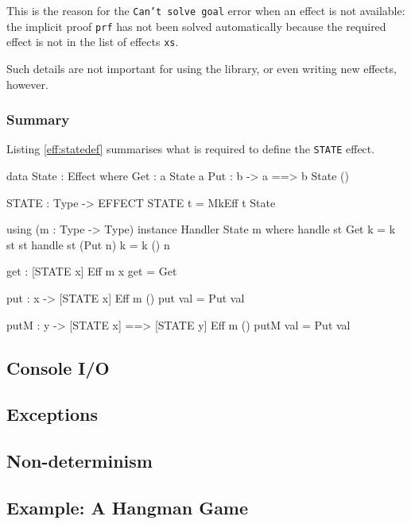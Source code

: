 \noindent
This is the reason for the \texttt{Can't solve goal} error when an effect is
not available: the implicit proof \texttt{prf} has not been solved automatically
because the required effect is not in the list of effects \texttt{xs}.

Such details are not important for using the library, or even writing new
effects, however. 

\subsubsection*{Summary}

Listing \ref{eff:statedef} summarises what is required to define the
\texttt{STATE} effect.

\begin{code}[float=h,frame=single, caption={Complete State Effect Definition}, label=eff:statedef]
data State : Effect where
     Get :      { a }       State a
     Put : b -> { a ==> b } State () 

STATE : Type -> EFFECT
STATE t = MkEff t State

using (m : Type -> Type)
  instance Handler State m where
     handle st Get     k = k st st
     handle st (Put n) k = k () n

get : { [STATE x] } Eff m x
get = Get

put : x -> { [STATE x] } Eff m () 
put val = Put val

putM : y -> { [STATE x] ==> [STATE y] } Eff m () 
putM val = Put val
\end{code}

\subsection{Console I/O}

\subsection{Exceptions}

\subsection{Non-determinism}


\subsection{Example: A Hangman Game}

